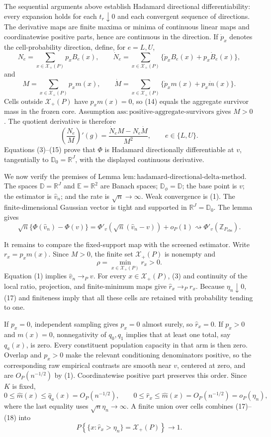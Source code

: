 The sequential arguments above establish Hadamard directional
differentiability: every expansion holds for each \(t_r\downarrow0\) and
each convergent sequence of directions.  The derivative maps are finite
maxima or minima of continuous linear maps and coordinatewise positive
parts, hence are continuous in the direction.  If \(\dot p_x\) denotes
the cell-probability direction, define, for \(e=L,U\),
\[
N_e=\sum_{x\in\mathcal X_+(P)}p_xB_e(x),
\qquad
\dot N_e=\sum_{x\in\mathcal X_+(P)}
\{\dot p_xB_e(x)+p_x\dot B_e(x)\},
\tag{13}
\]
and
\[
M=\sum_{x\in\mathcal X_+(P)}p_xm(x),
\qquad
\dot M=\sum_{x\in\mathcal X_+(P)}
\{\dot p_xm(x)+p_x\dot m(x)\}.
\tag{14}
\]
Cells outside \(\mathcal X_+(P)\) have \(p_xm(x)=0\), so (14) equals the
aggregate survivor mass in the frozen core.  Assumption
\(\mathrm{ass{:}positive\text{-}aggregate\text{-}survivors}\) gives
\(M>0\).  The quotient derivative is therefore
\[
\left(\frac{N_e}{M}\right)'(g)
=\frac{\dot N_eM-N_e\dot M}{M^2},
\qquad e\in\{L,U\}.
\tag{15}
\]
Equations (3)--(15) prove that \(\Phi\) is Hadamard directionally
differentiable at \(v\), tangentially to
\(\mathbb D_0=\mathbb R^J\), with the displayed continuous derivative.

We now verify the premises of Lemma
\(\mathrm{lem{:}hadamard\text{-}directional\text{-}delta\text{-}method}\).
The spaces \(\mathbb D=\mathbb R^J\) and \(\mathbb E=\mathbb R^2\) are
Banach spaces; \(\mathbb D_\phi=\mathbb D\); the base point is \(v\);
the estimator is \(\widehat v_n\); and the rate is \(\sqrt n\to\infty\).
Weak convergence is (1).  The finite-dimensional Gaussian vector is
tight and supported in \(\mathbb R^J=\mathbb D_0\).  The lemma gives
\[
\sqrt n\{\Phi(\widehat v_n)-\Phi(v)\}
=\Phi'_v\!\left(\sqrt n(\widehat v_n-v)\right)+o_P(1)
\rightsquigarrow\Phi'_v(\mathbb Z_{P_{\mathrm{obs}}}).
\tag{16}
\]

It remains to compare the fixed-support map with the screened estimator.
Write \(r_x=p_xm(x)\).  Since \(M>0\), the finite set
\(\mathcal X_+(P)\) is nonempty and
\[
\rho=\min_{x\in\mathcal X_+(P)}r_x>0.
\tag{17}
\]
Equation (1) implies \(\widehat v_n\to_Pv\).  For every
\(x\in\mathcal X_+(P)\), (3) and continuity of the local ratio,
projection, and finite-minimum maps give \(\widehat r_x\to_Pr_x\).
Because \(\eta_n\downarrow0\), (17) and finiteness imply that all these
cells are retained with probability tending to one.

If \(p_x=0\), independent sampling gives \(\widehat p_x=0\) almost surely,
so \(\widehat r_x=0\).  If \(p_x>0\) and \(m(x)=0\), nonnegativity of
\(q_0,q_1\) implies that at least one total, say \(q_a(x)\), is zero.
Every constituent population capacity in that arm is then zero.  Overlap
and \(p_x>0\) make the relevant conditioning denominators positive, so
the corresponding raw empirical contrasts are smooth near \(v\), centered
at zero, and are \(O_P(n^{-1/2})\) by (1).  Coordinatewise positive part
preserves this order.  Since \(K\) is fixed,
\[
0\le\widehat m(x)\le\widehat q_a(x)=O_P(n^{-1/2}),
\qquad
0\le\widehat r_x\le\widehat m(x)
=O_P(n^{-1/2})=o_P(\eta_n),
\tag{18}
\]
where the last equality uses \(\sqrt n\eta_n\to\infty\).  A finite union
over cells combines (17)--(18) into
\[
P\!\left\{\{x:\widehat r_x>\eta_n\}=\mathcal X_+(P)\right\}
\longrightarrow1.
\tag{19}
\]


